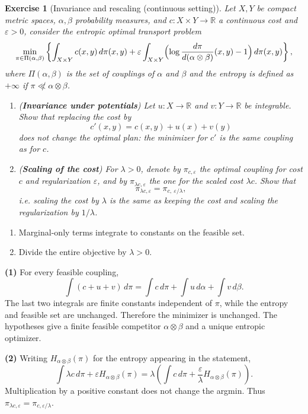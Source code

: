 \documentclass[11pt,a4paper]{article}
\theoremstyle{exostyle}
\newtheorem{exercise}{Exercise}
\newcommand{\R}{\mathbb{R}}
\begin{document}
\begin{exercise}[Invariance and rescaling (continuous setting)]\label{ex:invariance-primal-dual-cont}
Let $X,Y$ be compact metric spaces, $\alpha,\beta$ probability measures, and $c:X\times Y\to\R$ a continuous cost and $\varepsilon>0$, consider the entropic optimal transport problem
\[
\min_{\pi\in\Pi(\alpha,\beta)}
\left\{
\int_{X\times Y} c(x,y)\,d\pi(x,y)
+
\varepsilon \int_{X\times Y}
\Bigl(
\log \frac{d\pi}{d(\alpha\otimes\beta)}(x,y) - 1
\Bigr)\,d\pi(x,y)
\right\},
\]
where $\Pi(\alpha,\beta)$ is the set of couplings of $\alpha$ and $\beta$ and the entropy is defined as $+\infty$ if $\pi\not\ll\alpha\otimes\beta$.

\begin{enumerate}[label=\textbf{(\arabic*)}]
  \item (\textbf{Invariance under potentials})
  Let $u:X\to\R$ and $v:Y\to\R$ be integrable. Show that replacing the cost by
  \[
  c'(x,y)=c(x,y)+u(x)+v(y)
  \]
  does \emph{not} change the optimal plan: the minimizer for $c'$ is the same coupling as for $c$.

  \item (\textbf{Scaling of the cost})
  For $\lambda>0$, denote by $\pi_{c,\varepsilon}$ the optimal coupling for cost $c$ and regularization $\varepsilon$, and by $\pi_{\lambda c,\varepsilon}$ the one for the scaled cost $\lambda c$. Show that
  \[
  \pi_{\lambda c,\varepsilon}
  =
  \pi_{c,\ \varepsilon/\lambda},
  \]
  i.e. \emph{scaling the cost by $\lambda$ is the same as keeping the cost and scaling the regularization by $1/\lambda$}. \end{enumerate}
\end{exercise}
\begin{hints}
\begin{enumerate}[label=(\arabic*)]\item Marginal-only terms integrate to constants on the feasible set.\item Divide the entire objective by $\lambda>0$.\end{enumerate}
\end{hints}
\begin{solution}
\textbf{(1)} For every feasible coupling,
\[
\int(c+u+v)\,d\pi=\int c\,d\pi+\int u\,d\alpha+\int v\,d\beta.
\]
The last two integrals are finite constants independent of $\pi$, while the entropy and feasible set are unchanged. Therefore the minimizer is unchanged. The hypotheses give a finite feasible competitor $\alpha\otimes\beta$ and a unique entropic optimizer.

\textbf{(2)} Writing $H_{\alpha\otimes\beta}(\pi)$ for the entropy appearing in the statement,
\[
\int\lambda c\,d\pi+\varepsilon H_{\alpha\otimes\beta}(\pi)
=\lambda\left(\int c\,d\pi+\frac\varepsilon\lambda H_{\alpha\otimes\beta}(\pi)\right).
\]
Multiplication by a positive constant does not change the argmin. Thus $\pi_{\lambda c,\varepsilon}=\pi_{c,\varepsilon/\lambda}$.
\end{solution}
\end{document}
